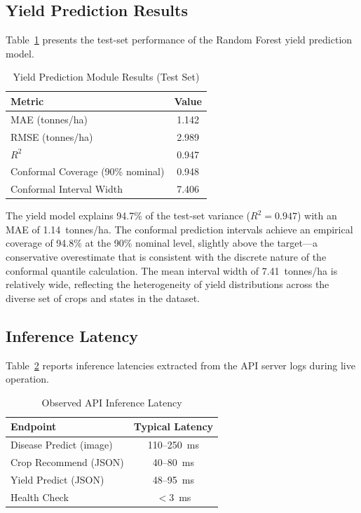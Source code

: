 \documentclass[conference]{IEEEtran}
\begin{document}
\subsection{Yield Prediction Results}

Table~\ref{tab:yield_results} presents the test-set performance of the Random Forest yield prediction model.

\begin{table}[htbp]
  \centering
  \caption{Yield Prediction Module Results (Test Set)}
  \label{tab:yield_results}
  \begin{tabular}{lc}
    \toprule
    \textbf{Metric} & \textbf{Value} \\
    \midrule
    MAE (tonnes/ha)                   & 1.142 \\
    RMSE (tonnes/ha)                  & 2.989 \\
    $R^{2}$                           & 0.947 \\
    Conformal Coverage (90\% nominal) & 0.948 \\
    Conformal Interval Width          & 7.406 \\
    \bottomrule
  \end{tabular}
\end{table}

The yield model explains 94.7\% of the test-set variance ($R^{2} = 0.947$) with an MAE of 1.14~tonnes/ha. The conformal prediction intervals achieve an empirical coverage of 94.8\% at the 90\% nominal level, slightly above the target---a conservative overestimate that is consistent with the discrete nature of the conformal quantile calculation. The mean interval width of 7.41~tonnes/ha is relatively wide, reflecting the heterogeneity of yield distributions across the diverse set of crops and states in the dataset.

\subsection{Inference Latency}

Table~\ref{tab:latency} reports inference latencies extracted from the API server logs during live operation.

\begin{table}[htbp]
  \centering
  \caption{Observed API Inference Latency}
  \label{tab:latency}
  \begin{tabular}{lc}
    \toprule
    \textbf{Endpoint} & \textbf{Typical Latency} \\
    \midrule
    Disease Predict (image)   & 110--250~ms \\
    Crop Recommend (JSON)     & 40--80~ms \\
    Yield Predict (JSON)      & 48--95~ms \\
    Health Check              & $<$3~ms \\
    \bottomrule
  \end{tabular}
\end{table}
\end{document}
